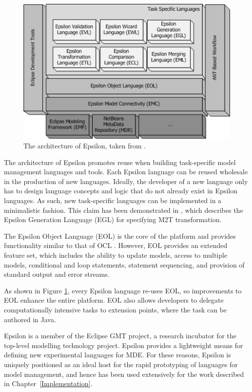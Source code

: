 \begin{figure}[htbp]
  \begin{center}
    \leavevmode
    \includegraphics[scale=0.6]{2.Background/images/epsilon.png}
  \end{center}
  \caption[The architecture of Epsilon]{The architecture of Epsilon, taken from \cite{rose08egl}.}
  \label{fig:epsilon}
\end{figure}

The architecture of Epsilon promotes reuse when building task-specific model management languages and tools. Each Epsilon language can be reused wholesale in the production of new languages. Ideally, the developer of a new language only has to design language concepts and logic that do not already exist in Epsilon languages. As such, new task-specific languages can be implemented in a minimalistic fashion. This claim has been demonstrated in \cite{rose08egl}, which describes the Epsilon Generation Language (EGL) for specifying M2T transformation.

The Epsilon Object Language (EOL) \cite{kolovos06eol} is the core of the platform and provides functionality similar to that of OCL \cite{ocl2}. However, EOL provides an extended feature set, which includes the ability to update models, access to multiple models, conditional and loop statements, statement sequencing, and provision of standard output and error streams.

As shown in Figure \ref{fig:epsilon}, every Epsilon language re-uses EOL, so improvements to EOL enhance the entire platform. EOL also allows developers to delegate computationally intensive tasks to extension points, where the task can be authored in Java.

Epsilon is a member of the Eclipse GMT \cite{gmt} project, a research incubator for the top-level modelling technology project. Epsilon provides a lightweight means for defining new experimental languages for MDE. For these reasons, Epsilon is uniquely positioned as an ideal host for the rapid prototyping of languages for model management, and hence has been used extensively for the work described in Chapter~\ref{Implementation}. 

